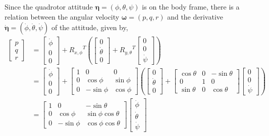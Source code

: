 Since the quadrotor attitude \({\boldsymbol \eta} = (\phi, \theta, \psi) \) is on the body frame, there is a relation between the angular velocity \({\boldsymbol \omega} = (p, q, r) \) and the derivative \( \dot{{\boldsymbol \eta}} = (\dot\phi, \dot\theta, \dot\psi)\) of the attitude, given by, \\
\begin{equation}
\begin{aligned}
\begin{bmatrix}
p\\
q\\
r
\end{bmatrix}
& =
\begin{bmatrix}
{\dot \phi} \\
0 \\
0
\end{bmatrix}
+ {R_{x, \phi}}^{T} \left(
\begin{bmatrix}
0 \\
{\dot \theta} \\
0
\end{bmatrix}
+ {R_{y, \theta}}^{T}
\begin{bmatrix}
0 \\
0 \\
{\dot \psi} 
\end{bmatrix}
\right) \\
& =
\begin{bmatrix}
{\dot \phi} \\
0 \\
0
\end{bmatrix}
+ 
\begin{bmatrix}
1 & 0    & 0 \\
0 & \cos{\phi}	& \sin{\phi} \\
0 & - \sin{\phi} 	& \cos{\phi}
\end{bmatrix}
\left(
\begin{bmatrix}
0 \\
{\dot \theta} \\
0
\end{bmatrix}
+
\begin{bmatrix}
\cos{\theta}	& 0    & - \sin{\theta}\\
0			& 1    & 0 \\
\sin{\theta}	&0	 & \cos{\theta}
\end{bmatrix}
\begin{bmatrix}
0 \\
0 \\
{\dot \psi} 
\end{bmatrix}
\right) \\
& = 
\begin{bmatrix}
1 	& 0    		& -\sin{\theta}\\
0 	& \cos{\phi}	& \sin{\phi} \cos{\theta} \\
0	& - \sin{\phi}	& \cos{\phi} \cos{\theta}
\end{bmatrix}
\begin{bmatrix}
{\dot \phi}\\
{\dot \theta} \\
{\dot \psi}
\end{bmatrix}\\
\end{aligned}
\end{equation}
